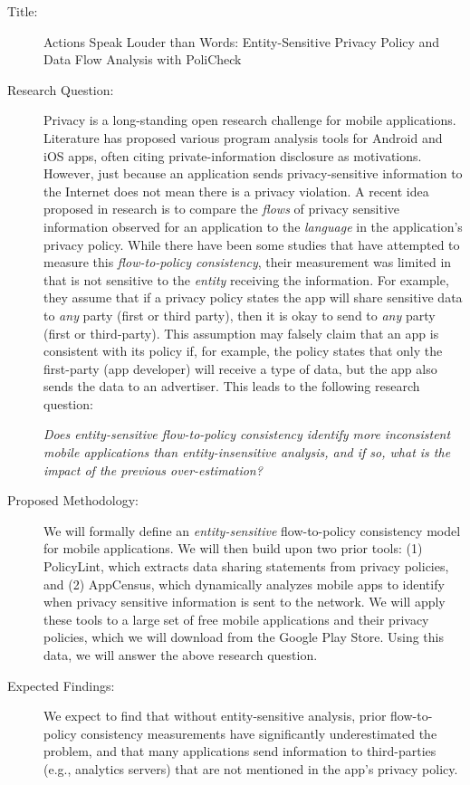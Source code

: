 \documentclass[10pt,pdftex]{article}
\begin{document}
\begin{description}

  \item[Title:] Actions Speak Louder than Words: Entity-Sensitive Privacy Policy and Data Flow Analysis with PoliCheck

  \item[Research Question:] 
    Privacy is a long-standing open research challenge for mobile applications. 
    Literature has proposed various program analysis tools for Android and iOS apps, often citing private-information disclosure as motivations.
    However, just because an application sends privacy-sensitive information to the Internet does not mean there is a privacy violation.
    A recent idea proposed in research is to compare the \emph{flows} of privacy sensitive information observed for an application to the \emph{language} in the application's privacy policy.
    While there have been some studies that have attempted to measure this \emph{flow-to-policy consistency}, their measurement was limited in that is not sensitive to the \emph{entity} receiving the information.
    For example, they assume that if a privacy policy states the app will share sensitive data to \emph{any} party (first or third party), then it is okay to send to \emph{any} party (first or third-party).
    This assumption may falsely claim that an app is consistent with its policy if, for example, the policy states that only the first-party (app developer) will receive a type of data, but the app also sends the data to an advertiser.
    This leads to the following research question:

    \textit{Does \emph{entity-sensitive} flow-to-policy consistency identify more inconsistent mobile applications than entity-insensitive analysis, and if so, what is the impact of the previous over-estimation?}

  \item[Proposed Methodology:] 
    We will formally define an \emph{entity-sensitive} flow-to-policy consistency model for mobile applications.
    We will then build upon two prior tools:
    (1) PolicyLint, which extracts data sharing statements from privacy policies, and
    (2) AppCensus, which dynamically analyzes mobile apps to identify when privacy sensitive information is sent to the network.
    We will apply these tools to a large set of free mobile applications and their privacy policies, which we will download from the Google Play Store.
    Using this data, we will answer the above research question.

  \item[Expected Findings:]
    We expect to find that without entity-sensitive analysis, prior flow-to-policy consistency measurements have significantly underestimated the problem, and that many applications send information to third-parties (e.g., analytics servers) that are not mentioned in the app's privacy policy.

\end{description}
\end{document}
